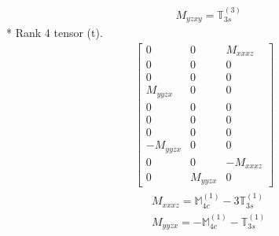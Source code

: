 \documentclass[fleqn,8pt,landscape]{jsarticle}
\begin{document}
\begin{align*}
& M_{yzxy} = \mathbb{T}_{3s}^{(3)}
\end{align*}
* Rank 4 tensor (t).
\begin{align*}
\begin{bmatrix} 0 & 0 & M_{xxxz} \\ 0 & 0 & 0 \\ 0 & 0 & 0 \\ M_{yyzx} & 0 & 0 \\ 0 & 0 & 0 \\ 0 & 0 & 0 \\ 0 & 0 & 0 \\ - M_{yyzx} & 0 & 0 \\ 0 & 0 & - M_{xxxz} \\ 0 & M_{yyzx} & 0 \end{bmatrix}
\end{align*}
\begin{align*}
& M_{xxxz} = \mathbb{M}_{4c}^{(1)} - 3 \mathbb{T}_{3s}^{(1)} \\
& M_{yyzx} = - \mathbb{M}_{4c}^{(1)} - \mathbb{T}_{3s}^{(1)}
\end{align*}
\end{document}
